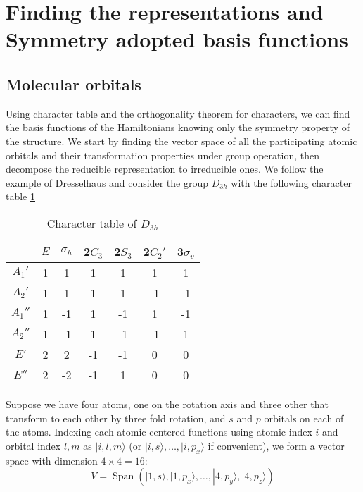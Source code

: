 \documentclass{article}
\DeclareMathOperator{\spn}{Span}
\begin{document}
\section{Finding the representations and Symmetry adopted basis functions}
\subsection{Molecular orbitals}
Using character table and the orthogonality theorem for characters, we can find the basis functions 
of the Hamiltonians knowing only the symmetry property of the structure. 
We start by finding the vector space of all the participating atomic orbitals and their transformation 
properties under group operation, then decompose the reducible representation to irreducible ones. 
We follow the example of Dresselhaus\cite{dresselhaus_group_2008} and consider the group $D_{3h}$ with 
the following character table \ref{T:ct}
\begin{table}[h!]
    \centering
    \caption{Character table of $D_{3h}$}
    \begin{tabular}{|c|c|c|c|c|c|c|}
                & $E$ & $\sigma_h$ & 2$C_3$ & 2$S_3$ & 2$C_2'$ & 3$\sigma_v$ \\ \hline
         $A_1'$ &  1  &  1         &  1     &  1     &   1     &   1         \\
         $A_2'$ &  1  &  1         &  1     &  1     &  -1     &  -1         \\
         $A_1''$&  1  & -1         &  1     & -1     &   1     &  -1         \\
         $A_2''$&  1  & -1         &  1     & -1     &  -1     &   1         \\
         $E'$   &  2  &  2         &  -1    & -1     &   0     &   0         \\
         $E''$  &  2  & -2         &  -1    &  1     &   0     &   0         \\ \hline
    \end{tabular}
    \label{T:ct}
\end{table}
Suppose we have four atoms, one on the rotation axis and three other that transform to each other 
by three fold rotation, and $s$ and $p$ orbitals on each of the atoms. Indexing each atomic 
centered functions using atomic index $i$ and orbital index $l,m$ as $| i,l,m \rangle$ 
(or $| i,s \rangle, \dots, |i,p_x\rangle$ if convenient), we form 
a vector space with dimension $4\times4 = 16$:
\begin{equation}
    V = \spn(| 1,s \rangle, | 1,p_x \rangle ,\dots, | 4,p_y \rangle, | 4,p_z \rangle)
\end{equation}
\end{document}
